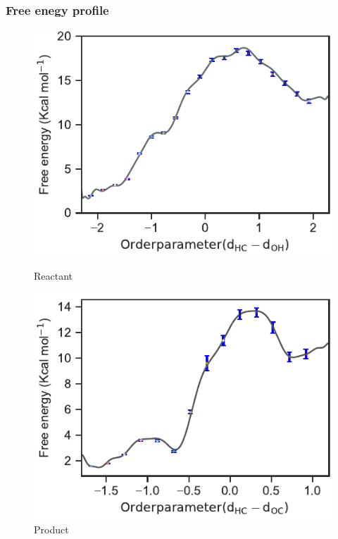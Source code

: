 \documentclass{beamer}
\begin{document}
\begin{frame}
\frametitle{Free enegy profile}
\begin{figure}
\centering
\begin{minipage}[b]{0.45\linewidth}
\includegraphics[scale=0.6]{figures/glu-fenergy.pdf}
\caption{Reactant}
\label{fig:minipagef1}
\end{minipage}
\quad
\begin{minipage}[b]{0.45\linewidth}
\includegraphics[scale=0.6]{figures/prot-alkox-fenergy.pdf}
\caption{Product}
\label{fig:minipagef2}
\end{minipage}
\end{figure}
\end{frame}
\end{document}
